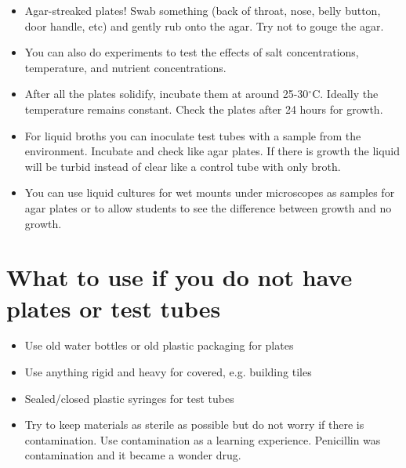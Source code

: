 \begin{itemize}

\item{Agar-streaked plates! Swab something (back of throat, nose, belly button, door handle, etc) and gently rub onto the agar. Try not to gouge the agar.}

\item{You can also do experiments to test the effects of salt concentrations, temperature, and nutrient concentrations.}

\item{After all the plates solidify, incubate them at around 25-30$^\circ$C. Ideally the temperature remains constant. Check the plates after 24 hours for growth.}

\item{For liquid broths you can inoculate test tubes with a sample from the environment. Incubate and check like agar plates. If there is growth the liquid will be turbid instead of clear like a control tube with only broth.}

\item{You can use liquid cultures for wet mounts under microscopes as samples for agar plates or to allow students to see the difference between growth and no growth.}

\end{itemize}

\section{What to use if you do not have plates or test tubes}

\begin{itemize}

\item{Use old water bottles or old plastic packaging for plates}

\item{Use anything rigid and heavy for covered, e.g. building tiles}

\item{Sealed/closed plastic syringes for test tubes}

\item{Try to keep materials as sterile as possible but do not worry if there is contamination. Use contamination as a learning experience. Penicillin was contamination and it became a wonder drug.}

\end{itemize}

